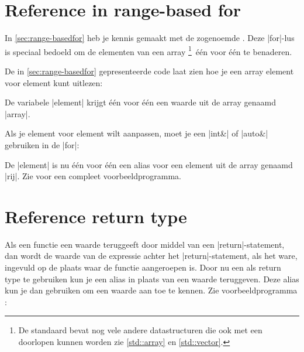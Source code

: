 \begin{cpplstShortInline}


\section{Reference in range-based for}
\label{sec:referenceinrange-basedfor}
In \cref{sec:range-basedfor} heb je kennis gemaakt met de zogenoemde \emph{}. 
Deze |for|\hyp{}lus is speciaal bedoeld om de elementen van een array%
\footnote{%
    De standaard \Cpp{}  bevat nog vele andere datastructuren die ook met een   doorlopen kunnen worden zie \cref{std::array} en \cref{std::vector}.
}\ één voor één te benaderen.

De in \cref{sec:range-basedfor} gepresenteerde code laat zien hoe je een array element voor element kunt uitlezen:

De variabele |element| krijgt één voor één een waarde uit de array genaamd |array|. 

Als je element voor element wilt aanpassen, moet je een |int&| of |auto&| gebruiken in de  |for|:

De  |element| is nu één voor één een alias voor een element uit de array genaamd |rij|. Zie  voor een compleet voorbeeldprogramma.

\section{Reference return type}
\label{refreturn}
Als een functie een waarde teruggeeft door middel van een |return|\hyp{}statement, dan wordt de waarde van de expressie achter het |return|\hyp{}statement, als het ware, ingevuld op de plaats waar de functie aangeroepen is.
Door nu een  als return type te gebruiken kun je een alias in plaats van een waarde teruggeven. Deze alias kun je dan gebruiken om een waarde aan toe te kennen. Zie voorbeeldprogramma : 


\end{cpplstShortInline}
